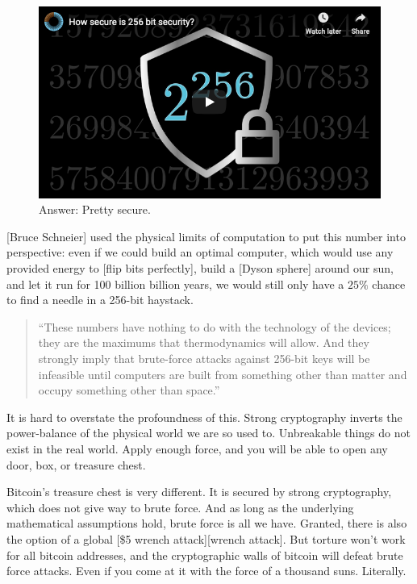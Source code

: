 \begin{figure}
  \includegraphics{assets/images/youtube-vid.png}
  \caption{Answer: Pretty secure.}
  \label{fig:youtube-vid}
\end{figure}

[Bruce Schneier] used the physical limits of computation to put this
number into perspective: even if we could build an optimal computer,
which would use any provided energy to [flip bits perfectly], build a
[Dyson sphere] around our sun, and let it run for 100 billion billion
years, we would still only have a $25\%$ chance to find a needle in a
256-bit haystack.

\begin{quotation}
``These numbers have nothing to do with the technology of the devices;
they are the maximums that thermodynamics will allow. And they
strongly imply that brute-force attacks against 256-bit keys will be
infeasible until computers are built from something other than matter
and occupy something other than space.''
\end{quotation}

It is hard to overstate the profoundness of this. Strong cryptography
inverts the power-balance of the physical world we are so used to.
Unbreakable things do not exist in the real world. Apply enough force,
and you will be able to open any door, box, or treasure chest.

Bitcoin's treasure chest is very different. It is secured by strong
cryptography, which does not give way to brute force. And as long as the
underlying mathematical assumptions hold, brute force is all we have.
Granted, there is also the option of a global [\$5 wrench attack][wrench attack].
But torture won't work for all bitcoin addresses, and the cryptographic
walls of bitcoin will defeat brute force attacks. Even if you come at it
with the force of a thousand suns. Literally.

